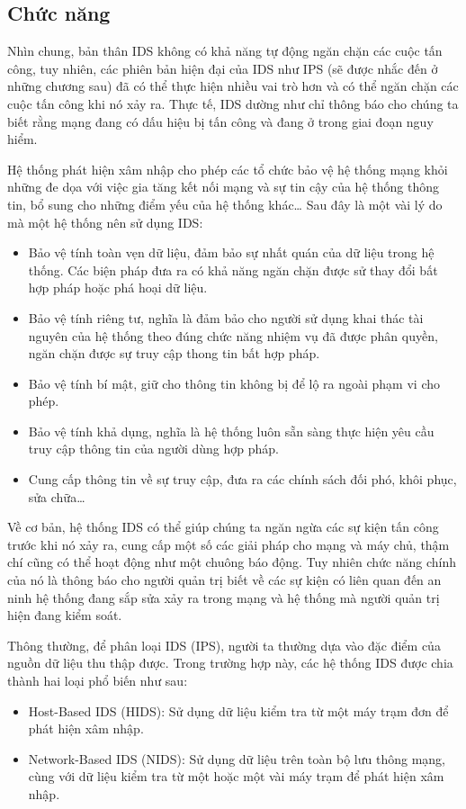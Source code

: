 \subsection{Chức năng}
Nhìn chung, bản thân IDS không có khả năng tự động ngăn chặn các cuộc tấn công, tuy nhiên, các phiên bản hiện đại của IDS như IPS (sẽ được nhắc đến ở những chương sau) đã có thể thực hiện nhiều vai trò hơn và có thể ngăn chặn các cuộc tấn công khi nó xảy ra. 
Thực tế, IDS dường như chỉ thông báo cho chúng ta biết rằng mạng đang có dấu hiệu bị tấn công và đang ở trong giai đoạn nguy hiểm.
\par
Hệ thống phát hiện xâm nhập cho phép các tổ chức bảo vệ hệ thống mạng khỏi những đe dọa với việc gia tăng kết nối mạng và sự tin cậy của hệ thống thông tin, bổ sung cho những điểm yếu của hệ thống khác…
Sau đây là một vài lý do mà một hệ thống nên sử dụng IDS:
\begin{itemize}
\item Bảo vệ tính toàn vẹn dữ liệu, đảm bảo sự nhất quán của dữ liệu trong hệ thống. Các biện pháp đưa ra có khả năng ngăn chặn được sử thay đổi bất hợp pháp hoặc phá hoại dữ liệu.
\item Bảo vệ tính riêng tư, nghĩa là đảm bảo cho người sử dụng khai thác tài nguyên của hệ thống theo đúng chức năng nhiệm vụ đã được phân quyền, ngăn chặn được sự truy cập thong tin bất hợp pháp.
\item Bảo vệ tính bí mật, giữ cho thông tin không bị để lộ ra ngoài phạm vi cho phép.
\item Bảo vệ tính khả dụng, nghĩa là hệ thống luôn sẵn sàng thực hiện yêu cầu truy cập thông tin của người dùng hợp pháp.
\item Cung cấp thông tin về sự truy cập, đưa ra các chính sách đối phó, khôi phục, sửa chữa…
\end{itemize}
Về cơ bản, hệ thống IDS có thể giúp chúng ta ngăn ngừa các sự kiện tấn công trước khi nó xảy ra, cung cấp một số các giải pháp cho mạng và máy chủ, thậm chí cũng có thể hoạt động như một chuông báo động. 
Tuy nhiên chức năng chính của nó là thông báo cho người quản trị biết về các sự kiện có liên quan đến an ninh hệ thống đang sắp sửa xảy ra trong mạng và hệ thống mà người quản trị hiện đang kiểm soát.
\par
Thông thường, để phân loại IDS (IPS), người ta thường dựa vào đặc điểm của nguồn dữ liệu thu thập được. Trong trường hợp này, các hệ thống IDS được chia thành hai loại phổ biến như sau:
\begin{itemize}    
\item Host-Based IDS (HIDS): Sử dụng dữ liệu kiểm tra từ một máy trạm đơn để phát hiện xâm nhập.
\item Network-Based IDS (NIDS): Sử dụng dữ liệu trên toàn bộ lưu thông mạng, cùng với dữ liệu kiểm tra từ một hoặc một vài máy trạm để phát hiện xâm nhập.
\end{itemize}
